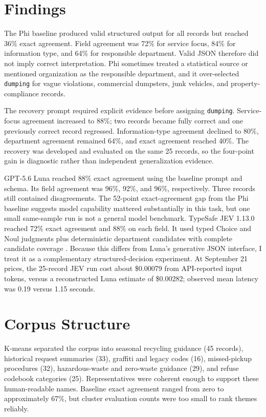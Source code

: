 \documentclass[9pt]{article}
\newcommand{\pct}[1]{#1\%}
\begin{document}
\vspace{-4pt}
\noindent\begin{minipage}[t]{0.485\textwidth}
\vspace{0pt}
\section{Findings}
The Phi baseline produced valid structured output for all records but reached \pct{36} exact agreement. Field agreement was \pct{72} for service focus, \pct{84} for information type, and \pct{64} for responsible department. Valid JSON therefore did not imply correct interpretation. Phi sometimes treated a statistical source or mentioned organization as the responsible department, and it over-selected \texttt{dumping} for vague violations, commercial dumpsters, junk vehicles, and property-compliance records.

The recovery prompt required explicit evidence before assigning \texttt{dumping}. Service-focus agreement increased to \pct{88}; two records became fully correct and one previously correct record regressed. Information-type agreement declined to \pct{80}, department agreement remained \pct{64}, and exact agreement reached \pct{40}. The recovery was developed and evaluated on the same 25 records, so the four-point gain is diagnostic rather than independent generalization evidence.

GPT-5.6 Luna reached \pct{88} exact agreement using the baseline prompt and schema. Its field agreement was \pct{96}, \pct{92}, and \pct{96}, respectively. Three records still contained disagreements. The 52-point exact-agreement gap from the Phi baseline suggests model capability mattered substantially in this task, but one small same-sample run is not a general model benchmark. TypeSafe JEV 1.13.0 reached \pct{72} exact agreement and \pct{88} on each field. It used typed Choice and Noul judgments plus deterministic department candidates with complete candidate coverage \cite{typesafe}. Because this differs from Luna’s generative JSON interface, I treat it as a complementary structured-decision experiment. At September 21 prices, the 25-record JEV run cost about \$0.00079 from API-reported input tokens, versus a reconstructed Luna estimate of \$0.00282; observed mean latency was 0.19 versus 1.15 seconds.

\section{Corpus Structure}
K-means separated the corpus into seasonal recycling guidance (45 records), historical request summaries (33), graffiti and legacy codes (16), missed-pickup procedures (32), hazardous-waste and zero-waste guidance (29), and refuse codebook categories (25). Representatives were coherent enough to support these human-readable names. Baseline exact agreement ranged from zero to approximately \pct{67}, but cluster evaluation counts were too small to rank themes reliably.


\end{minipage}
\end{document}
